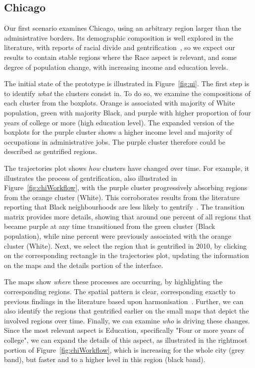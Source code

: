 \subsection{Chicago}
Our first scenario examines Chicago, using an arbitrary region larger than the
administrative borders. Its demographic composition is well explored in the
literature, with reports of racial divide and
gentrification~\citep{Delmelle2016,Delmelle2017,Hwang2014}, so we expect our
results to contain stable regions where the Race aspect is relevant, and some
degree of population change, with increasing income and education levels. 


The initial state of the prototype is illustrated in Figure~\ref{fig:ui}. The
first step is to identify \textit{what} the clusters consist in. To do so, we
examine the compositions of each cluster from the boxplots. Orange is associated
with majority of White population, green with majority Black, and purple with
higher proportion of four years of college or more (high education level). The
expanded version of the boxplots for the purple cluster shows a higher income
level and majority of occupations in administrative jobs. The purple cluster
therefore could be described as gentrified regions.


The trajectories plot shows \textit{how} clusters have changed over time.  For
example, it illustrates the process of gentrification, also illustrated in
Figure~\ref{fig:chiWorkflow}, with the purple cluster progressively absorbing
regions from the orange cluster (White). This corroborates results from the
literature reporting that Black neighbourhoods are less likely to
gentrify~\citep{Hwang2014}. The transition matrix provides more details, showing
that around one percent of all regions that became purple at any time
transitioned from the green cluster (Black population), while nine percent were
previously associated with the orange cluster (White). Next, we select the region
that is gentrified in 2010, by clicking on the corresponding rectangle in the
trajectories plot, updating the information on the maps and the details portion
of the interface.

The maps show \textit{where} these processes are occurring, by highlighting the
corresponding regions. The spatial pattern is clear, corresponding exactly to
previous findings in the literature based upon harmonisation~\citep{Hwang2014}.
Further, we can also identify the regions that gentrified earlier on the small
maps that depict the involved regions over time. Finally, we can examine
\textit{who} is driving these changes. Since the most relevant aspect is
Education, specifically "Four or more years of college", we can expand the
details of this aspect, as illustrated in the rightmost portion of
Figure~\ref{fig:chiWorkflow}, which is increasing for the whole city (grey
band), but faster and to a higher level in this region (black band).


